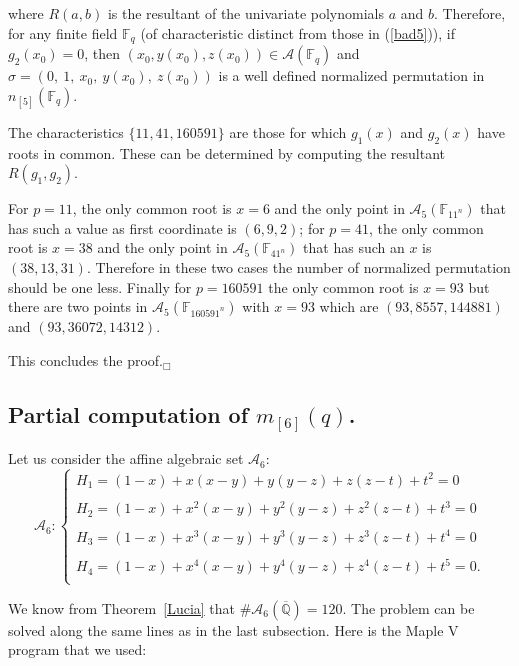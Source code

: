 \documentclass[a4paper,twoside]{article}
\begin{document}
where $R(a,b)$ is the resultant of the univariate polynomials $a$
and $b$. Therefore, for any finite field $\mathbb F_q$ (of
characteristic distinct from those in (\ref{bad5})), if
$g_2(x_0)=0$, then  $(x_0,y(x_0),z(x_0))\in\mathcal A(\mathbb
F_q)$ and $\sigma=(0,\ 1,\ x_0,\ y(x_0),\ z(x_0))$ is a well
defined normalized permutation in $n_{[5]}(\mathbb F_q)$.

The characteristics $\{11, 41, 160591\}$ are those for which
$g_1(x)$ and $g_2(x)$ have roots in common. These can be
determined by computing the resultant $R(g_1,g_2)$.

For $p=11$, the only common root is $x=6$ and the only point in
$\mathcal A_5(\mathbb F_{11^n})$ that has such a value as first
coordinate is $(6,9,2)$; for $p=41$, the only common root is
$x=38$ and the only point in $\mathcal A_5(\mathbb F_{41^n})$ that
has such an $x$ is $(38,13,31)$. Therefore in these two cases the
number of normalized permutation should be one less. Finally for
$p=160591$ the only common root is $x=93$ but there are two points
in $\mathcal A_5(\mathbb F_{160591^n})$ with $x=93$ which are
$(93,8557,144881)$ and $(93,36072,14312)$.

This concludes the proof.\hfill$_\Box$\bigskip


\subsection{Partial computation of $m_{[6]}(q)$.}

Let us consider the affine algebraic set $\mathcal A_{6}$:
$$\mathcal A_6:\left\{
\begin{array}{r}
H_1=(1-x)+x(x-y)+y(y-z)+z(z-t)+t^2=0\\
\\
H_2=(1-x)+x^2(x-y)+y^2(y-z)+z^2(z-t)+t^3=0\\
\\
H_3=(1-x)+x^3(x-y)+y^3(y-z)+z^3(z-t)+t^4=0\\
\\
H_4=(1-x)+x^4(x-y)+y^4(y-z)+z^4(z-t)+t^5=0.\\
\end{array}
\right.$$

We know from Theorem~\ref{Lucia} that $\#\mathcal
A_6(\overline{\mathbb Q})=120$. The problem can be solved along
the same lines as in the last subsection. Here is the Maple V
program that
we used: %
\end{document}
